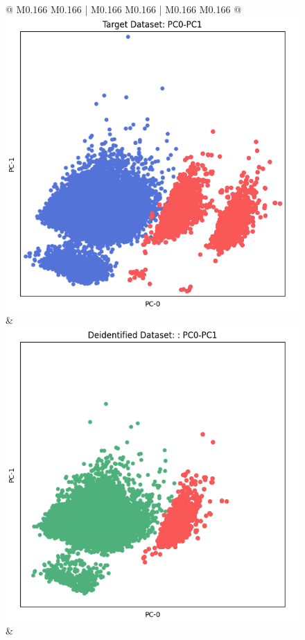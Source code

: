 \begin{figure}[p!]
\begin{tabular}{@{} M{0.166\textwidth} M{0.166\textwidth} | M{0.166\textwidth} M{0.166\textwidth} | M{0.166\textwidth} M{0.166\textwidth} @{}}
       \includegraphics[width=\linewidth]{z_YData.orig.png} &
       \includegraphics[width=\linewidth]{z_YData.syn.png} \\ 
 &

\end{tabular}
\end{figure}
